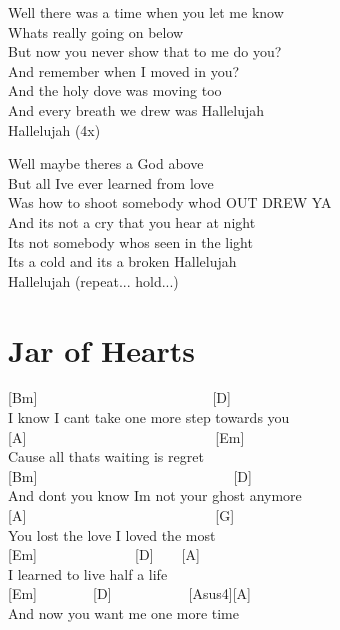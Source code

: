 \documentclass[
  letterpaper,
  twoside=false]{scrbook}
\begin{document}
Well there was a time when you let me know\\
What\textquotesingle s really going on below\\
But now you never show that to me do you?\\
And remember when I moved in you?\\
And the holy dove was moving too\\
And every breath we drew was Hallelujah\\
Hallelujah (4x)

Well maybe there\textquotesingle s a God above\\
But all I\textquotesingle ve ever learned from love\\
Was how to shoot somebody who\textquotesingle d OUT DREW YA\\
And it\textquotesingle s not a cry that you hear at night\\
It\textquotesingle s not somebody who\textquotesingle s seen in the
light\\
It\textquotesingle s a cold and it\textquotesingle s a broken
Hallelujah\\
Hallelujah (repeat... hold...)

\hypertarget{jar-of-hearts}{%
\chapter{Jar of Hearts}\label{jar-of-hearts}}

{[}Bm{]}~~~~~~~~~~~~~~~~~~~~~~~~~{[}D{]}\\
I know I can\textquotesingle t take one more step towards you\\
{[}A{]}~~~~~~~~~~~~~~~~~~~~~~~~~~~{[}Em{]}\\
\textquotesingle Cause all thats waiting is regret\\
{[}Bm{]}~~~~~~~~~~~~~~~~~~~~~~~~~~~~{[}D{]}\\
And don\textquotesingle t you know I\textquotesingle m not your ghost
anymore\\
{[}A{]}~~~~~~~~~~~~~~~~~~~~~~~~~~~{[}G{]}\\
You lost the love I loved the most\\
{[}Em{]}~~~~~~~~~~~~~~{[}D{]}~~~~{[}A{]}\\
I learned to live half a life\\
{[}Em{]}~~~~~~~~{[}D{]}~~~~~~~~~~~{[}Asus4{]}{[}A{]}\\
And now you want me one more time
\end{document}
